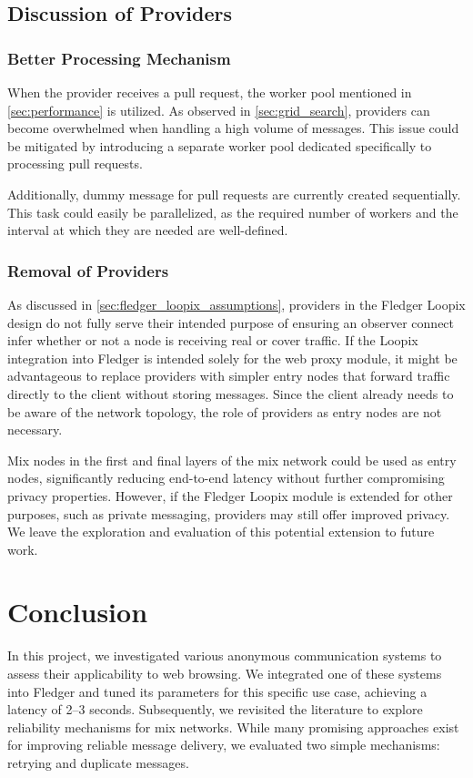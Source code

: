 \documentclass[a4paper,11pt,oneside]{report}
\begin{document}
\section{Discussion of Providers}

\subsection{Better Processing Mechanism}

When the provider receives a pull request, the worker pool mentioned in \autoref{sec:performance} is utilized. As observed in \autoref{sec:grid_search}, providers can become overwhelmed when handling a high volume of messages. This issue could be mitigated by introducing a separate worker pool dedicated specifically to processing pull requests.

Additionally, dummy message for pull requests are currently created sequentially. This task could easily be parallelized, as the required number of workers and the interval at which they are needed are well-defined.

\subsection{Removal of Providers}

As discussed in \autoref{sec:fledger_loopix_assumptions}, providers in the Fledger Loopix design do not fully serve their intended purpose of ensuring an observer connect infer whether or not a node is receiving real or cover traffic. If the Loopix integration into Fledger is intended solely for the web proxy module, it might be advantageous to replace providers with simpler entry nodes that forward traffic directly to the client without storing messages. Since the client already needs to be aware of the network topology, the role of providers as entry nodes are not necessary.

Mix nodes in the first and final layers of the mix network could be used as entry nodes, significantly reducing end-to-end latency without further compromising privacy properties. However, if the Fledger Loopix module is extended for other purposes, such as private messaging, providers may still offer improved privacy. We leave the exploration and evaluation of this potential extension to future work.

\chapter{Conclusion}
In this project, we investigated various anonymous communication systems to assess their applicability to web browsing. We integrated one of these systems into Fledger and tuned its parameters for this specific use case, achieving a latency of 2–3 seconds. Subsequently, we revisited the literature to explore reliability mechanisms for mix networks. While many promising approaches exist for improving reliable message delivery, we evaluated two simple mechanisms: retrying and duplicate messages.
\end{document}
